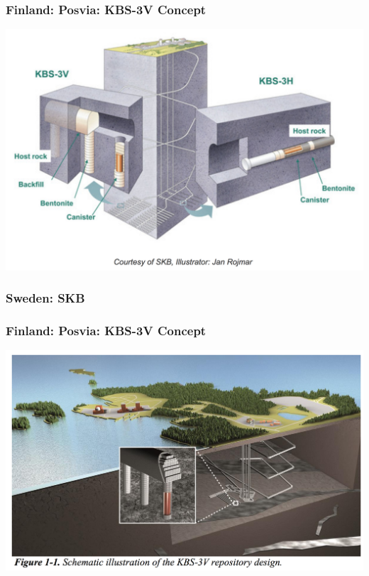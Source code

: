 \begin{frame}[c]
\frametitle{Finland: Posvia: KBS-3V Concept}
\includegraphics[width=\textwidth]{./images/finland-concept}
\end{frame}
\begin{frame}[c]
\frametitle{Sweden: SKB}
\frametitle{Finland: Posvia: KBS-3V Concept}
\includegraphics[width=\textwidth]{./images/finland-concept-cartoon}
\end{frame}
